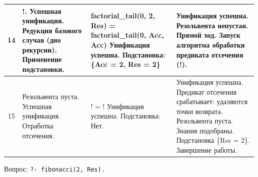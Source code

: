 \begin{tabularx}{\textwidth}{|c|>{\small}X|>{\small}X|>{\small}X|}
	14                                                                                 &
	!. \newline
	Успешная унификация. \newline
	Редукция базового случая (дно рекурсии). \newline
	Применение подстановки.                                                            &
	factorial\_tail(0, 2, Res) = \newline
	factorial\_tail(0, Acc, Acc) \newline
	Унификация успешна. \newline
	Подстановка: \newline
	\{Acc = 2, Res = 2\}                                                               &
	Унификация успешна. \newline
	Резольвента непустая. \newline
	Прямой ход. \newline
	Запуск алгоритма обработки предиката отсечения (!).                                        \\
	\hline

	15                                                                                 &
	Резольвента пуста. \newline
	Успешная унификация. \newline
	Отработка отсечения.                                                               &
	! = \newline
	! \newline
	Унификация успешна. \newline
	Подстановка: \newline
	Нет.                                                                               &
	Унификация успешна. \newline
	Предикат отсечения срабатывает: удаляются точки возврата. \newline
	Резольвента пуста. \newline
	Знания подобраны. Подстановка \{Res = 2\}. \newline
	Завершение работы.                                                                         \\
	\hline
\end{tabularx}

\clearpage
Вопрос: \texttt{?- fibonacci(2, Res).}

